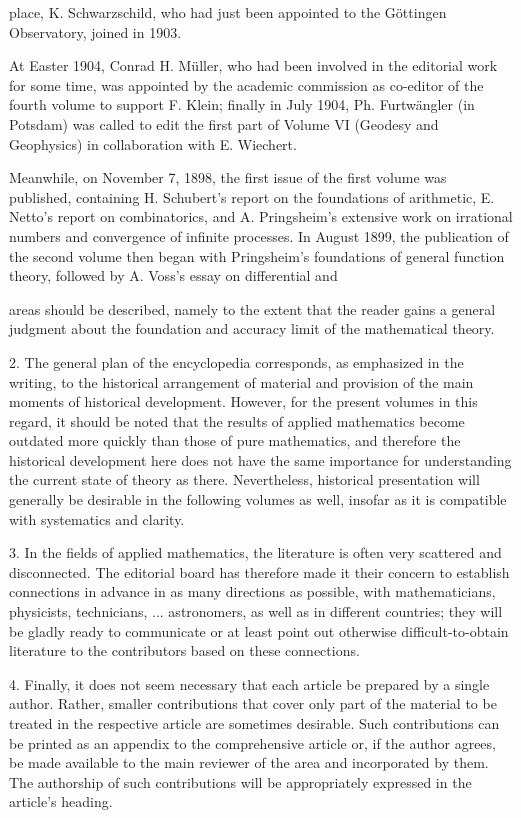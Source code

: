 \thispagestyle{fancy}

\vspace{0.5cm}

place, K. Schwarzschild, who had just been appointed to the Göttingen Observatory, joined in 1903.

At Easter 1904, Conrad H. Müller, who had been involved in the editorial work for some time, was appointed by the academic commission as co-editor of the fourth volume to support F. Klein; finally in July 1904, Ph. Furtwängler (in Potsdam) was called to edit the first part of Volume VI (Geodesy and Geophysics) in collaboration with E. Wiechert.

Meanwhile, on November 7, 1898, the first issue of the first volume was published, containing H. Schubert's report on the foundations of arithmetic, E. Netto's report on combinatorics, and A. Pringsheim's extensive work on irrational numbers and convergence of infinite processes. In August 1899, the publication of the second volume then began with Pringsheim's foundations of general function theory, followed by A. Voss's essay on differential and

\vfill
\leftline{\rule{2in}{0.4pt}}
\vspace{0.2cm}
{\footnotesize areas should be described, namely to the extent that the reader gains a general judgment about the foundation and accuracy limit of the mathematical theory.

2. The general plan of the encyclopedia corresponds, as emphasized in the writing, to the historical arrangement of material and provision of the main moments of historical development. However, for the present volumes in this regard, it should be noted that the results of applied mathematics become outdated more quickly than those of pure mathematics, and therefore the historical development here does not have the same importance for understanding the current state of theory as there. Nevertheless, historical presentation will generally be desirable in the following volumes as well, insofar as it is compatible with systematics and clarity.

3. In the fields of applied mathematics, the literature is often very scattered and disconnected. The editorial board has therefore made it their concern to establish connections in advance in as many directions as possible, with mathematicians, physicists, technicians, ... astronomers, as well as in different countries; they will be gladly ready to communicate or at least point out otherwise difficult-to-obtain literature to the contributors based on these connections.

4. Finally, it does not seem necessary that each article be prepared by a single author. Rather, smaller contributions that cover only part of the material to be treated in the respective article are sometimes desirable. Such contributions can be printed as an appendix to the comprehensive article or, if the author agrees, be made available to the main reviewer of the area and incorporated by them. The authorship of such contributions will be appropriately expressed in the article's heading.

}
